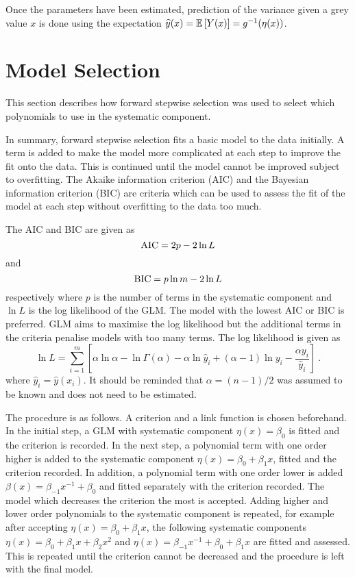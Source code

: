 Once the parameters have been estimated, prediction of the variance given a grey value $x$ is done using the expectation $\widehat{y}(x) = \operatorname{\mathbb{E}}\left[Y(x)\right] = g^{-1}(\eta(x))$.

\section{Model Selection}

This section describes how forward stepwise selection \citep{friedman2001elements} was used to select which polynomials to use in the systematic component.

In summary, forward stepwise selection fits a basic model to the data initially. A term is added to make the model more complicated at each step to improve the fit onto the data. This is continued until the model cannot be improved subject to overfitting. The Akaike information criterion (AIC) \citep{friedman2001elements} and the Bayesian information criterion (BIC) \citep{friedman2001elements} are criteria which can be used to assess the fit of the model at each step without overfitting to the data too much.

The AIC and BIC are given as
\begin{equation}
\mathrm{AIC} = 2p-2\ln L
\end{equation}
and
\begin{equation}
\mathrm{BIC} = p\ln m - 2\ln L
\end{equation}
respectively where $p$ is the number of terms in the systematic component and $\ln L$ is the log likelihood of the GLM. The model with the lowest AIC or BIC is preferred. GLM aims to maximise the log likelihood but the additional terms in the criteria penalise models with too many terms. The log likelihood is given as
\begin{equation}
  \ln L = \sum_{i=1}^m \left[
    \alpha\ln\alpha
    -\ln\Gamma(\alpha)
    -\alpha\ln \widehat{y}_i
    +(\alpha-1)\ln y_i
    -\frac{\alpha y_i}{\widehat{y}_i}
  \right]
  \ .
\end{equation}
where $\widehat{y}_i=\widehat{y}(x_i)$. It should be reminded that $\alpha=(n-1)/2$ was assumed to be known and does not need to be estimated.

The procedure is as follows. A criterion and a link function is chosen beforehand. In the initial step, a GLM with systematic component $\eta(x)=\beta_0$ is fitted and the criterion is recorded. In the next step, a polynomial term with one order higher is added to the systematic component $\eta(x)=\beta_0+\beta_1 x$, fitted and the criterion recorded. In addition, a polynomial term with one order lower is added $\beta(x)=\beta_{-1}x^{-1}+\beta_0$ and fitted separately with the criterion recorded. The model which decreases the criterion the most is accepted. Adding higher and lower order polynomials to the systematic component is repeated, for example after accepting $\eta(x)=\beta_0+\beta_1 x$, the following systematic components $\eta(x)=\beta_0+\beta_1 x+\beta_2x^2$ and $\eta(x)=\beta_{-1}x^{-1}+\beta_0+\beta_1 x$ are fitted and assessed. This is repeated until the criterion cannot be decreased and the procedure is left with the final model.

